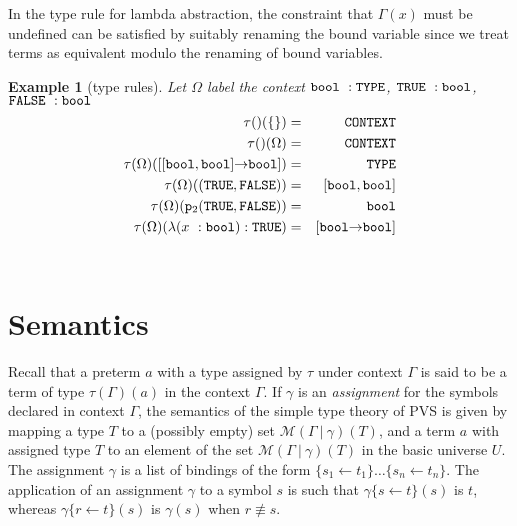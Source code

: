 \documentclass [12pt,twoside]{cslreport}
\newcommand{\thmbox}
   {{\ \hfill\hbox{%
      \vrule width1.0ex height1.0ex
   }\parfillskip 0pt }}
\newtheorem{example}[thm]{Example}
\newcommand{\aro}{\mathord\rightarrow} %
\newcommand{\funtype}[2]{[#1 \aro #2]}
\newcommand{\tupletype}[1]{[#1]}
\newcommand{\proj}[1]{\mathtt{p}_{#1}}
\newcommand{\tttype}{\mathtt{TYPE}}
\newcommand{\ttcontext}{\mathtt{CONTEXT}}
\newcommand{\vbar}{\ |\ }
\newenvironment{Eg}[1]{\begin{example}[#1]\label{eg:#1}\em }{\thmbox\end{example}}
\begin{document}
 In the type rule for lambda abstraction, the constraint that
$\Gamma(x)$ must be undefined can be satisfied by suitably renaming the
bound variable since we treat terms as equivalent modulo the renaming of
bound variables.  


\begin{Eg}{type rules}  Let $\Omega$ label the context
$\coln{ \mathtt{bool}}{\tttype{}}$,
            $\mathtt{TRUE}\ : \mathtt{bool}$,
            $\mathtt{FALSE}\ :  \mathtt{bool}$
\begin{eqnarray*}
\tau()(\{\}) & = & \ttcontext\\
\tau()(\Omega)
   & = & \ttcontext\\
\tau(\Omega)(\funtype{\tupletype{ \mathtt{bool}, \mathtt{bool}}}{
\mathtt{bool}}) & = & \tttype{}\\
\tau(\Omega)(( \mathtt{TRUE}, \mathtt{FALSE})) & = & \tupletype{ \mathtt{bool},
\mathtt{bool}}\\
\tau(\Omega)( \proj{2} ( \mathtt{TRUE}, \mathtt{FALSE})) & = & \mathtt{bool}\\
\tau(\Omega)(\lambda (\coln{x}{ \mathtt{bool}}) : \mathtt{TRUE}) & = &
\funtype{ \mathtt{bool}}{ \mathtt{bool}}
\end{eqnarray*}
\end{Eg}

\section{Semantics}

Recall that a preterm $a$ with a type assigned by $\tau$  under context $\Gamma$
is said to be a term of type $\tau(\Gamma)(a)$
in the context $\Gamma$.  If $\gamma$ 
is an \emph{assignment} for the symbols declared in context $\Gamma$, the
semantics of the simple type theory of PVS 
is given by  mapping  a type $T$ to a (possibly empty) set
$\mathcal{M}(\Gamma\vbar \gamma)(T)$, 
and a term $a$ with assigned type $T$ to an element of the set $\mathcal{
M}(\Gamma\vbar \gamma)(T)$ in the basic universe $U$\@. 
The assignment $\gamma$ is a list of bindings of the form $\{s_1\gets
t_1\}\ldots \{s_n\gets t_n \}$\@.  The application of an assignment
$\gamma$ to a symbol $s$ is such that $\gamma \{s \gets t\} (s)$ is $t$,
whereas $\gamma \{r \gets t\}(s)$ is $\gamma(s)$ when $r\not\equiv s$\@.
\end{document}
